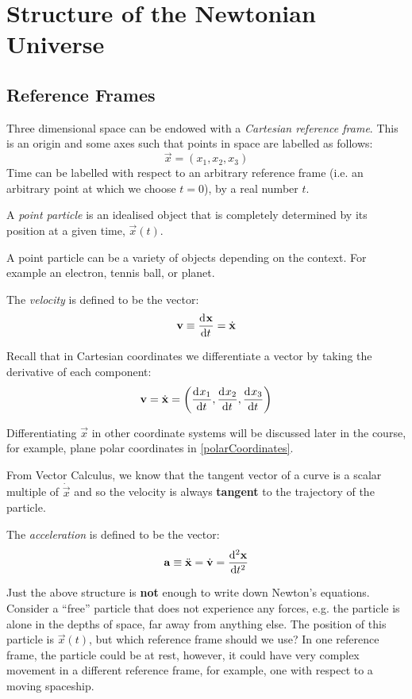 \documentclass[../main.tex]{subfiles}
\begin{document}
\chapter{Structure of the Newtonian Universe}
\section{Reference Frames}
\label{referenceFrames}
Three dimensional space can be endowed with a \textit{Cartesian reference frame}.
This is an origin and some axes such that points in space are labelled as follows:
  \[
    \vec{x} = (x_1, x_2, x_3)
  \]
Time can be labelled with respect to an arbitrary reference frame (i.e. an arbitrary point at which we choose $t = 0$), by a real number $t$.
\begin{definition}
  A \textit{point particle} is an idealised object that is completely determined by its position at a given time, $\vec{x}(t)$.
\end{definition}
A point particle can be a variety of objects depending on the context. For example an electron, tennis ball, or planet.
\begin{definition}[Velocity]
  The \textit{velocity} is defined to be the vector:
  \[
    \vec{v} \equiv \deriv{\vec{x}}{t} = \dot{\vec{x}}
  \]
\end{definition}
Recall that in Cartesian coordinates we differentiate a vector by taking the derivative of each component:
\[
  \vec{v} = \dot{\vec{x}} = \left(\deriv{x_1}{t}, \deriv{x_2}{t}, \deriv{x_3}{t}\right)
\]
\begin{remark}
  Differentiating $\vec{x}$ in other coordinate systems will be discussed later in the course, for example, plane polar coordinates in \cref{polarCoordinates}.
\end{remark}
From Vector Calculus, we know that the tangent vector of a curve is a scalar multiple of $\dot{\vec{x}}$ and so the velocity is always \textbf{tangent} to the trajectory of the particle.
\begin{definition}[Acceleration]
  The \textit{acceleration} is defined to be the vector:
  \[
    \vec{a} \equiv \ddot{\vec{x}} = \dot{\vec{v}} = \deriv[2]{\vec{x}}{t}
  \]
\end{definition}
Just the above structure is \textbf{not} enough to write down Newton's equations.
Consider a ``free'' particle that does not experience any forces, e.g. the particle is alone in the depths of space, far away from anything else.
The position of this particle is $\vec{x}(t)$, but which reference frame should we use?
In one reference frame, the particle could be at rest, however, it could have very complex movement in a different reference frame, for example, one with respect to a moving spaceship.
\end{document}
